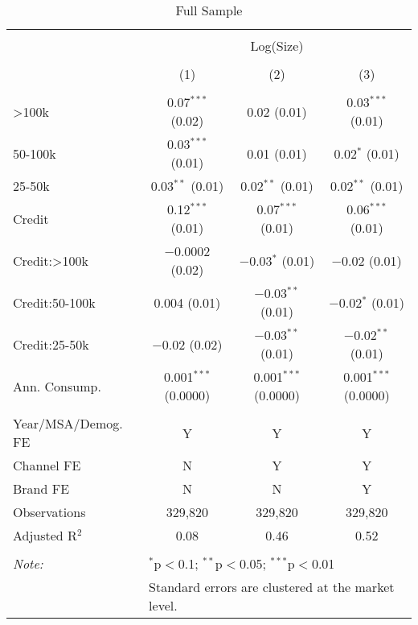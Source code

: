 
\begin{table}[!htbp] \centering 
  \caption{Full Sample} 
  \label{tab:packageSizeFullDetergent} 
\begin{tabular}{@{\extracolsep{5pt}}lccc} 
\\[-1.8ex]\hline 
\hline \\[-1.8ex] 
 & \multicolumn{3}{c}{Log(Size)} \\ 
\\[-1.8ex] & (1) & (2) & (3)\\ 
\hline \\[-1.8ex] 
 >100k & 0.07$^{***}$ (0.02) & 0.02 (0.01) & 0.03$^{***}$ (0.01) \\ 
  50-100k & 0.03$^{***}$ (0.01) & 0.01 (0.01) & 0.02$^{*}$ (0.01) \\ 
  25-50k & 0.03$^{**}$ (0.01) & 0.02$^{**}$ (0.01) & 0.02$^{**}$ (0.01) \\ 
  Credit & 0.12$^{***}$ (0.01) & 0.07$^{***}$ (0.01) & 0.06$^{***}$ (0.01) \\ 
  Credit:>100k & $-$0.0002 (0.02) & $-$0.03$^{*}$ (0.01) & $-$0.02 (0.01) \\ 
  Credit:50-100k & 0.004 (0.01) & $-$0.03$^{**}$ (0.01) & $-$0.02$^{*}$ (0.01) \\ 
  Credit:25-50k & $-$0.02 (0.02) & $-$0.03$^{**}$ (0.01) & $-$0.02$^{**}$ (0.01) \\ 
  Ann. Consump. & 0.001$^{***}$ (0.0000) & 0.001$^{***}$ (0.0000) & 0.001$^{***}$ (0.0000) \\ 
 \hline \\[-1.8ex] 
Year/MSA/Demog. FE & Y & Y & Y \\ 
Channel FE & N & Y & Y \\ 
Brand FE & N & N & Y \\ 
Observations & 329,820 & 329,820 & 329,820 \\ 
Adjusted R$^{2}$ & 0.08 & 0.46 & 0.52 \\ 
\hline 
\hline \\[-1.8ex] 
\textit{Note:}  & \multicolumn{3}{l}{$^{*}$p$<$0.1; $^{**}$p$<$0.05; $^{***}$p$<$0.01} \\ 
 & \multicolumn{3}{l}{Standard errors are clustered at the market level.} \\ 
\end{tabular} 
\end{table} 
